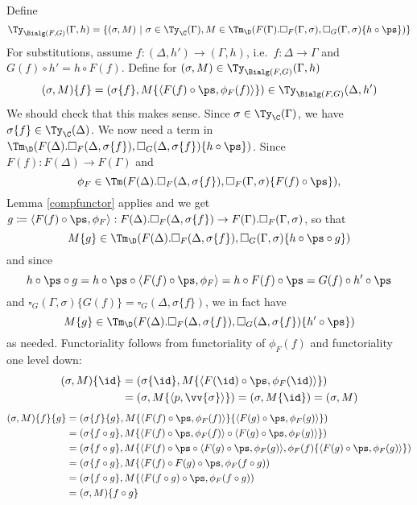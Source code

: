\documentclass{article}
\newcommand{\isoFL}{\ensuremath{\phi_{F}}} %
\begin{document}
Define
\[
\Ty_{\Bialg(F, G)}(\Gamma, h) = \{ (\sigma, M)\ |\ \sigma \in \Ty_{\C}(\Gamma),
 M \in \Tm_\D(F(\Gamma).\square_F(\Gamma, \sigma),\square_G(\Gamma, \sigma)\{h \circ \ps\})\}
\]
For substitutions, assume $f : (\Delta, h') \to (\Gamma, h)$, i.e.\ $f
: \Delta \to \Gamma$ and $G(f) \circ h' = h \circ F(f)$. Define for $(\sigma, M) \in \Ty_{\Bialg(F, G)}(\Gamma, h)$
\[
(\sigma, M)\{f\} = (\sigma\{f\}, M\{\langle F(f) \circ \ps, \isoFL(f)\rangle\}) \in \Ty_{\Bialg(F, G)}(\Delta, h')
\]
%
We should check that this makes sense. Since $\sigma \in
\Ty_{\C}(\Gamma)$, we have $\sigma\{f\} \in \Ty_{\C}(\Delta)$. We now
need a term in $\Tm_\D(F(\Delta).\square_F(\Delta,
\sigma\{f\}),\square_G(\Delta, \sigma\{f\})\{h \circ \ps\})$.  Since
$F(f) : F(\Delta) \to F(\Gamma)$ and
\[
\isoFL \in \Tm(F(\Delta).\square_F(\Delta, \sigma\{f\}),
\square_F(\Gamma, \sigma)\{F(f) \circ \ps\}),
\]
Lemma \ref{compfunctor} applies and we get $g \coloneqq \langle F(f) \circ \ps,
\isoFL\rangle : F(\Delta).\square_F(\Delta, \sigma\{f\}) \to
F(\Gamma).\square_F(\Gamma, \sigma)$, so that
\[
M\{g\} \in
\Tm_\D(F(\Delta).\square_F(\Delta, \sigma\{f\}),\square_G(\Gamma,
\sigma)\{h \circ \ps \circ g\})
\]
and since
\[
h \circ \ps \circ g = h \circ \ps \circ \langle F(f) \circ \ps,
\isoFL\rangle = h \circ F(f) \circ \ps = G(f) \circ h' \circ \ps
\]
and $\square_G(\Gamma, \sigma)\{G(f)\} = \square_G(\Delta,
\sigma\{f\})$, we in fact have
\[
M\{g\} \in \Tm_\D(F(\Delta).\square_F(\Delta,
\sigma\{f\}),\square_G(\Delta, \sigma\{f\})\{h' \circ \ps\})
\]
as needed.
Functoriality follows from functoriality of $\isoFL(f)$ and functoriality one level down:
\begin{align*}
(\sigma, M)\{\id\} &= (\sigma\{\id\}, M\{\langle F(\id) \circ \ps, \isoFL(\id)\rangle\}) \\ &=
  (\sigma, M\{\langle p, \vv{\sigma}\rangle\}) = (\sigma, M\{\id\}) = (\sigma, M)
\end{align*}
\begin{align*}
  (\sigma, M)\{f\}\{g\} 
  &= (\sigma\{f\}\{g\}, M\{\langle F(f) \circ \ps, \isoFL(f)\rangle\}\{\langle F(g) \circ \ps, \isoFL(g)\rangle\}) \\
  &= (\sigma\{f \circ g\}, M\{\langle F(f) \circ \ps, \isoFL(f)\rangle \circ \langle F(g) \circ \ps, \isoFL(g)\rangle\}) \\
  &= (\sigma\{f \circ g\}, M\{\langle F(f) \circ \ps \circ \langle F(g) \circ \ps, \isoFL(g)\rangle, \isoFL(f)\{\langle F(g) \circ \ps, \isoFL(g)\rangle\}) \\
  &= (\sigma\{f \circ g\}, M\{\langle F(f) \circ F(g) \circ \ps, \isoFL(f \circ g)) \\
  &= (\sigma\{f \circ g\}, M\{\langle F(f \circ g) \circ \ps, \isoFL(f \circ g)) \\
  &= (\sigma, M)\{f \circ g\}
\end{align*}
\end{document}
